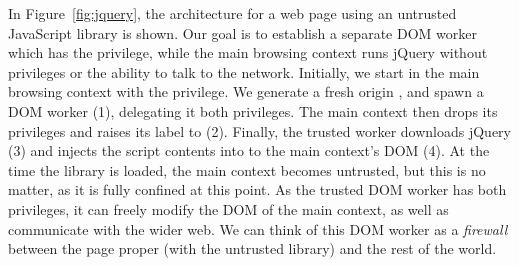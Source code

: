 In Figure~\ref{fig:jquery}, the architecture for a web page using an
untrusted JavaScript library is shown.  Our goal is to establish a
separate DOM worker which has the  privilege, while the
main browsing context runs jQuery without privileges or the ability to
talk to the network.  Initially, we start in the main browsing context
with the  privilege.  We generate a fresh origin
, and spawn a DOM worker (1), delegating it both privileges.  The
main context then drops its privileges and raises its label to
 (2).  Finally, the
trusted worker downloads jQuery (3) and injects the script contents
into to the main context's DOM (4).  At the time the library
is loaded, the main context becomes untrusted, but this is no matter, as
it is fully confined at this point.  As the trusted DOM worker has both
privileges, it can freely modify the DOM of the main context, as well as
communicate with the wider web.  We can think of this DOM worker as a
\emph{firewall} between the page proper (with the untrusted library)
and the rest of the world.
